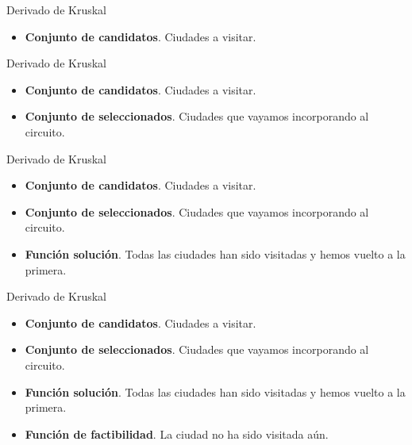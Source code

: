 \documentclass{beamer}
\begin{document}
\begin{frame}[fragile]{Derivado de Kruskal}

\begin{itemize}
	\item \textbf{Conjunto de candidatos}. Ciudades a visitar.
\end{itemize}

\end{frame}

\begin{frame}[fragile]{Derivado de Kruskal}

\begin{itemize}
	\item \textbf{Conjunto de candidatos}. Ciudades a visitar.
	\item \textbf{Conjunto de seleccionados}. Ciudades que vayamos incorporando al circuito.
\end{itemize}

\end{frame}

\begin{frame}[fragile]{Derivado de Kruskal}

\begin{itemize}
	\item \textbf{Conjunto de candidatos}. Ciudades a visitar.
	\item \textbf{Conjunto de seleccionados}. Ciudades que vayamos incorporando al circuito.
	\item \textbf{Función solución}. Todas las ciudades han sido visitadas y hemos vuelto a la primera.
\end{itemize}

\end{frame}

\begin{frame}[fragile]{Derivado de Kruskal}

\begin{itemize}
	\item \textbf{Conjunto de candidatos}. Ciudades a visitar.
	\item \textbf{Conjunto de seleccionados}. Ciudades que vayamos incorporando al circuito.
	\item \textbf{Función solución}. Todas las ciudades han sido visitadas y hemos vuelto a la primera.
	\item \textbf{Función de factibilidad}. La ciudad no ha sido visitada aún.
\end{itemize}

\end{frame}
\end{document}
